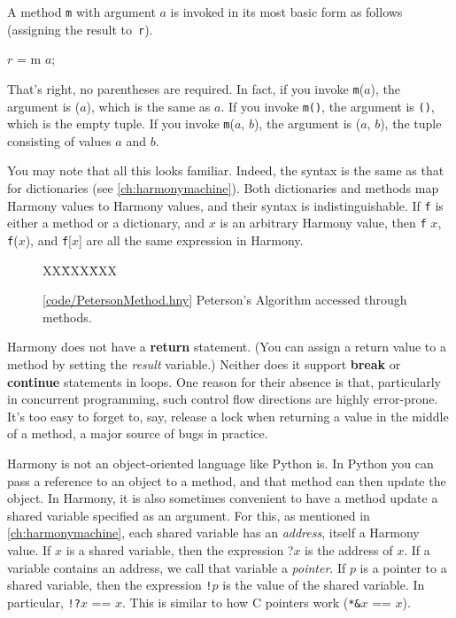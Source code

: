 \documentclass{report}
\newcommand{\harmonysource}[1]{
\begin{tabbing}
XX\=XXX\=XXX\kill
    
\end{tabbing}
}
\newcommand{\harmonylink}[1]{%
[\href{https://harmony.cs.cornell.edu/#1}{\underline{#1}}]%
}
\newenvironment{code}{
\tcolorbox
}{
\endtcolorbox
}
\begin{document}
A method \texttt{m} with argument $a$ is invoked in its
most basic form as follows (assigning the result to~\texttt{r}).
\begin{code}
$r$ = m $a$;
\end{code}
That's right, no parentheses are required.  In fact, if you invoke
\texttt{m}($a$), the argument is ($a$), which is the same
as $a$.
If you invoke \texttt{m()}, the argument is \texttt{()},
which is the empty tuple.
If you invoke \texttt{m}($a$, $b$), the argument is ($a$, $b$),
the tuple consisting of values $a$ and $b$.

You may note that all this looks familiar.  Indeed, the syntax
is the same as that for dictionaries (see \autoref{ch:harmonymachine}).
Both dictionaries and methods map Harmony values to Harmony values,
and their syntax is indistinguishable.
If \texttt{f} is either a method or a
dictionary, and $x$ is an arbitrary Harmony value, then
\texttt{f} $x$, \texttt{f}($x$), and \texttt{f}[$x$] are all
the same expression in Harmony.

\begin{figure}
\begin{code}
\harmonysource{PetersonMethod}
\end{code}
\caption{\harmonylink{code/PetersonMethod.hny} Peterson's Algorithm accessed through methods.}
\label{fig:petersonmethods}
\end{figure}

Harmony does not have a \textbf{return} statement.  (You can assign a return value
to a method by setting the \textit{result} variable.)  Neither does it support
\textbf{break} or \textbf{continue} statements in loops.  One reason for their absence is
that, particularly in concurrent programming, such control flow directions are highly
error-prone.  It's too easy to forget to, say, release a lock when returning a value in the
middle of a method, a major source of bugs in practice.

Harmony is not an object-oriented language like Python is.  In Python
you can pass a reference to an object to a method, and that method
can then update the object.  In Harmony, it is also sometimes convenient
to have a method update a shared variable specified as an argument.
For this, as mentioned in \autoref{ch:harmonymachine},
each shared variable has an \emph{address}, itself a Harmony value.
%
If $x$ is a shared variable, then the expression ?$x$ is the address of $x$.
If a variable contains an address, we call that variable a \emph{pointer}.
%
If $p$ is a pointer to a shared variable, then the
expression \texttt{!}$p$ is the value of the shared variable.
In particular, \texttt{!?}$x$ == $x$.
This is similar to how C pointers work (\texttt{*\string&}$x$ == $x$).
\end{document}
